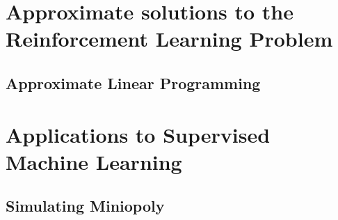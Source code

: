 \documentclass[colorful]{sty/itam-thesis}
\begin{document}
\part{Approximate solutions to the Reinforcement Learning 
Problem}

\chapter{Approximate Linear Programming}



\part{Applications to Supervised Machine Learning}

\appendix

\chapter{Simulating Miniopoly}


\nocite{*}
\printbibliography
\end{document}
